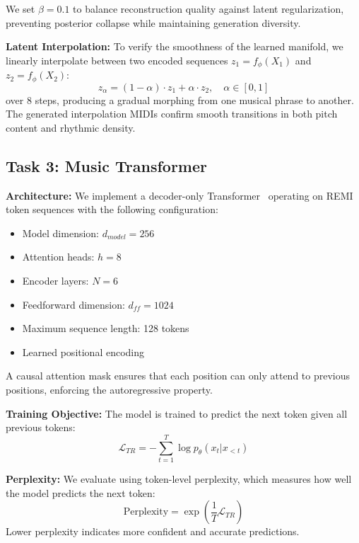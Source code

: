 \documentclass[conference]{IEEEtran}
\begin{document}
We set $\beta = 0.1$ to balance reconstruction quality against latent regularization, preventing posterior collapse while maintaining generation diversity.

\textbf{Latent Interpolation:} To verify the smoothness of the learned manifold, we linearly interpolate between two encoded sequences $z_1 = f_\phi(X_1)$ and $z_2 = f_\phi(X_2)$:
\begin{equation}
z_\alpha = (1-\alpha) \cdot z_1 + \alpha \cdot z_2, \quad \alpha \in [0, 1]
\end{equation}
over 8 steps, producing a gradual morphing from one musical phrase to another. The generated interpolation MIDIs confirm smooth transitions in both pitch content and rhythmic density.

\subsection{Task 3: Music Transformer}

\textbf{Architecture:} We implement a decoder-only Transformer~\cite{huang2019} operating on REMI token sequences with the following configuration:

\begin{itemize}
    \item Model dimension: $d_{model} = 256$
    \item Attention heads: $h = 8$
    \item Encoder layers: $N = 6$
    \item Feedforward dimension: $d_{ff} = 1024$
    \item Maximum sequence length: 128 tokens
    \item Learned positional encoding
\end{itemize}

A causal attention mask ensures that each position can only attend to previous positions, enforcing the autoregressive property.

\textbf{Training Objective:} The model is trained to predict the next token given all previous tokens:
\begin{equation}
\mathcal{L}_{TR} = -\sum_{t=1}^{T} \log p_\theta(x_t | x_{<t})
\end{equation}

\textbf{Perplexity:} We evaluate using token-level perplexity, which measures how well the model predicts the next token:
\begin{equation}
\text{Perplexity} = \exp\left(\frac{1}{T}\mathcal{L}_{TR}\right)
\end{equation}
Lower perplexity indicates more confident and accurate predictions.
\end{document}
